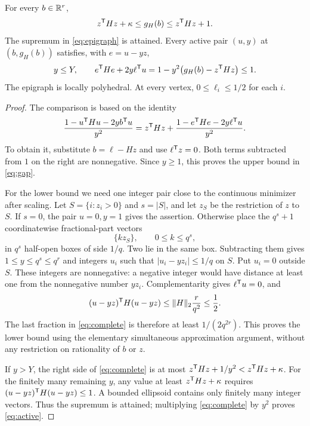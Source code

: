 \begin{lemma}\label{lem:gap}
For every $b\in\mathbb R^r$,
\begin{equation}\label{eq:gap}
 z^{\mathsf T} Hz+\kappa\le g_H(b)\le z^{\mathsf T} Hz+1.
\end{equation}
The supremum in \eqref{eq:epigraph} is attained. Every active pair $(u,y)$ at $(b,g_H(b))$ satisfies, with $e=u-yz$,
\begin{equation}\label{eq:active}
 y\le Y,\qquad
 e^{\mathsf T} He+2y\ell^{\mathsf T} u
   =1-y^2\bigl(g_H(b)-z^{\mathsf T} Hz\bigr)\le1.
\end{equation}
The epigraph is locally polyhedral. At every vertex, $0\le\ell_i\le1/2$ for each $i$.
\end{lemma}
\begin{proof}
The comparison is based on the identity
\begin{equation}\label{eq:complete}
 \frac{1-u^{\mathsf T} Hu-2yb^{\mathsf T} u}{y^2}
 =z^{\mathsf T} Hz+\frac{1-e^{\mathsf T} He-2y\ell^{\mathsf T} u}{y^2}.
\end{equation}
To obtain it, substitute $b=\ell-Hz$ and use $\ell^{\mathsf T} z=0$. Both terms subtracted from $1$ on the right are nonnegative. Since $y\ge1$, this proves the upper bound in \eqref{eq:gap}.

For the lower bound we need one integer pair close to the continuous minimizer after scaling. Let $S=\{i:z_i>0\}$ and $s=|S|$, and let $z_S$ be the restriction of $z$ to $S$. If $s=0$, the pair $u=0,y=1$ gives the assertion. Otherwise place the $q^s+1$ coordinatewise fractional-part vectors
\[
 \{kz_S\},\qquad 0\le k\le q^s,
\]
in $q^s$ half-open boxes of side $1/q$. Two lie in the same box. Subtracting them gives $1\le y\le q^s\le q^r$ and integers $u_i$ such that $|u_i-yz_i|\le1/q$ on $S$. Put $u_i=0$ outside $S$. These integers are nonnegative: a negative integer would have distance at least one from the nonnegative number $yz_i$. Complementarity gives $\ell^{\mathsf T} u=0$, and
\[
 (u-yz)^{\mathsf T} H(u-yz)\le\lVert H\rVert_2\frac r{q^2}\le\frac12.
\]
The last fraction in \eqref{eq:complete} is therefore at least $1/(2q^{2r})$. This proves the lower bound using the elementary simultaneous approximation argument, without any restriction on rationality of $b$ or $z$.

If $y>Y$, the right side of \eqref{eq:complete} is at most
$z^{\mathsf T} Hz+1/y^2<z^{\mathsf T} Hz+\kappa$.
For the finitely many remaining $y$, any value at least $z^{\mathsf T} Hz+\kappa$ requires $(u-yz)^{\mathsf T} H(u-yz)\le1$. A bounded ellipsoid contains only finitely many integer vectors. Thus the supremum is attained; multiplying \eqref{eq:complete} by $y^2$ proves \eqref{eq:active}.


\end{proof}
